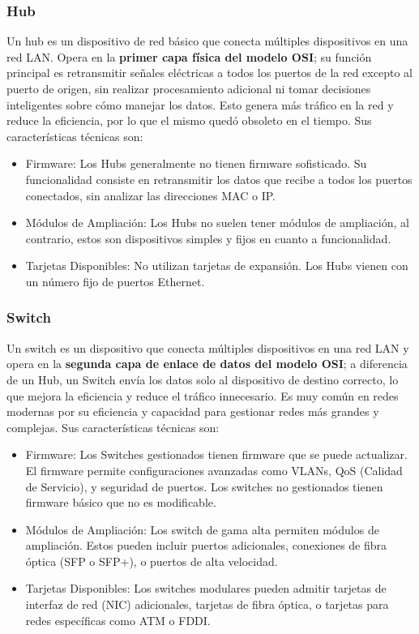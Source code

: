\documentclass{article}
\begin{document}
\subsubsection{Hub}
Un hub es un dispositivo de red básico que conecta múltiples dispositivos en una red LAN. Opera en la \textbf{primer capa física del modelo OSI}; su función principal es retransmitir señales eléctricas a todos los puertos de la red excepto al puerto de origen, sin realizar procesamiento adicional ni tomar decisiones inteligentes sobre cómo manejar los datos. Esto genera más tráfico en la red y reduce la eficiencia, por lo que el mismo quedó obsoleto en el tiempo. Sus características técnicas son:

\begin{itemize}
    \item Firmware: Los Hubs generalmente no tienen firmware sofisticado. Su funcionalidad consiste en retransmitir los datos que recibe a todos los puertos conectados, sin analizar las direcciones MAC o IP.
    \item Módulos de Ampliación: Los Hubs no suelen tener módulos de ampliación, al contrario, estos son dispositivos simples y fijos en cuanto a funcionalidad.
    \item Tarjetas Disponibles: No utilizan tarjetas de expansión. Los Hubs vienen con un número fijo de puertos Ethernet.
\end{itemize}


\subsubsection{Switch}
Un switch es un dispositivo que conecta múltiples dispositivos en una red LAN y opera en la \textbf{segunda capa de enlace de datos del modelo OSI}; a diferencia de un Hub, un Switch envía los datos solo al dispositivo de destino correcto, lo que mejora la eficiencia y reduce el tráfico innecesario. Es muy común en redes modernas por su eficiencia y capacidad para gestionar redes más grandes y complejas. Sus características técnicas son:

\begin{itemize}
    \item Firmware: Los Switches gestionados tienen firmware que se puede actualizar. El firmware permite configuraciones avanzadas como VLANs, QoS (Calidad de Servicio), y seguridad de puertos. Los switches no gestionados tienen firmware básico que no es modificable.
    \item Módulos de Ampliación: Los switch de gama alta permiten módulos de ampliación. Estos pueden incluir puertos adicionales, conexiones de fibra óptica (SFP o SFP+), o puertos de alta velocidad. 
    \item Tarjetas Disponibles: Los switches modulares pueden admitir tarjetas de interfaz de red (NIC) adicionales, tarjetas de fibra óptica, o tarjetas para redes específicas como ATM o FDDI.
\end{itemize}
\end{document}
